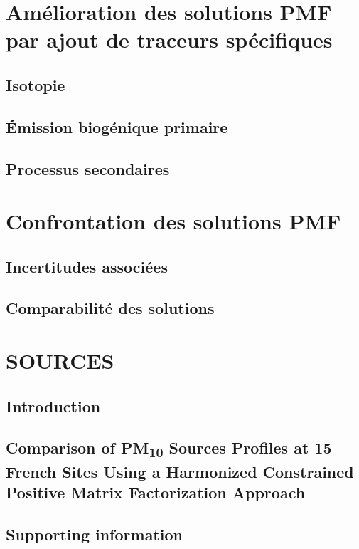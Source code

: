 
\section{Amélioration des solutions PMF par ajout de traceurs spécifiques}%
\label{sec:amélioration_des_solutions_pmf}

\subsection{Isotopie}%
\label{sub:isotopie}

\subsection{Émission biogénique primaire}%
\label{sub:émission_biogénique_primaire}

\subsection{Processus secondaires}%
\label{sub:processus_secondaires}

\section{Confrontation des solutions PMF}%
\label{sec:confrontation_des_solutions_pmf}

\subsection{Incertitudes associées}%
\label{sub:incertitudes_associées}

\subsection{Comparabilité des solutions}%
\label{sub:comparabilité_des_solutions}

\section{SOURCES}%
\label{sec:sources}

\subsection{Introduction}

\subsection{Comparison of PM\textsubscript{10} Sources Profiles at 15 French Sites Using a Harmonized Constrained Positive Matrix Factorization Approach}%
\label{sub:article}



\subsection{Supporting information}%
\label{sub:supporting_information}




